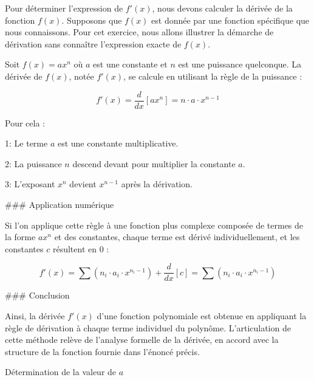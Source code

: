 \documentclass[answers]{exam}
\begin{document}
\begin{questions}
\begin{solution}
Pour déterminer l'expression de $f'(x)$, nous devons calculer la dérivée de la fonction $f(x)$. Supposons que $f(x)$ est donnée par une fonction spécifique que nous connaissons. Pour cet exercice, nous allons illustrer la démarche de dérivation sans connaître l'expression exacte de $f(x)$.

Soit $f(x) = ax^n$ où $a$ est une constante et $n$ est une puissance quelconque. La dérivée de $f(x)$, notée $f'(x)$, se calcule en utilisant la règle de la puissance :

\[
f'(x) = \frac{d}{dx} [ax^n] = n \cdot a \cdot x^{n-1}
\]

Pour cela :

\begin{compactitem}
  \item [1:] Le terme $a$ est une constante multiplicative.
  \item [2:] La puissance $n$ descend devant pour multiplier la constante $a$.
  \item [3:] L'exposant $x^{n}$ devient $x^{n-1}$ après la dérivation.
\end{compactitem}

### Application numérique

Si l'on applique cette règle à une fonction plus complexe composée de termes de la forme $ax^n$ et des constantes, chaque terme est dérivé individuellement, et les constantes $c$ résultent en $0$ :

\[
f'(x) = \sum (n_i \cdot a_i \cdot x^{n_i-1}) + \frac{d}{dx}[c] = \sum (n_i \cdot a_i \cdot x^{n_i-1})
\]

### Conclusion

Ainsi, la dérivée $f'(x)$ d'une fonction polynomiale est obtenue en appliquant la règle de dérivation à chaque terme individuel du polynôme. L'articulation de cette méthode relève de l'analyse formelle de la dérivée, en accord avec la structure de la fonction fournie dans l'énoncé précis.
\end{solution}

\question[2.5] Détermination de la valeur de $a$
  


\end{questions}
\end{document}
